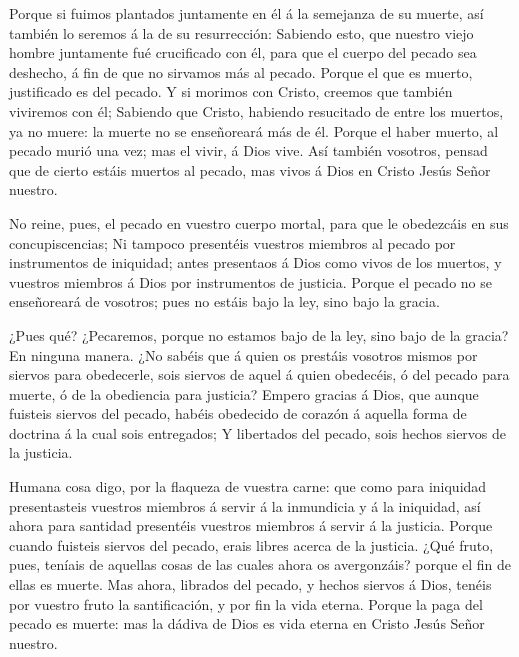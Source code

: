  Porque si fuimos plantados juntamente en él á la semejanza
de su muerte, así también lo seremos á la de su resurrección:
 Sabiendo esto, que nuestro viejo hombre juntamente fué
crucificado con él, para que el cuerpo del pecado sea deshecho, á fin de
que no sirvamos más al pecado.  Porque el que es muerto,
justificado es del pecado.  Y si morimos con Cristo, creemos
que también viviremos con él;  Sabiendo que Cristo, habiendo
resucitado de entre los muertos, ya no muere: la muerte no se
enseñoreará más de él.  Porque el haber muerto, al pecado
murió una vez; mas el vivir, á Dios vive.  Así también
vosotros, pensad que de cierto estáis muertos al pecado, mas vivos á
Dios en Cristo Jesús Señor nuestro.

 No reine, pues, el pecado en vuestro cuerpo mortal, para
que le obedezcáis en sus concupiscencias;  Ni tampoco
presentéis vuestros miembros al pecado por instrumentos de iniquidad;
antes presentaos á Dios como vivos de los muertos, y vuestros miembros á
Dios por instrumentos de justicia.  Porque el pecado no se
enseñoreará de vosotros; pues no estáis bajo la ley, sino bajo la
gracia.

 ¿Pues qué? ¿Pecaremos, porque no estamos bajo de la ley,
sino bajo de la gracia? En ninguna manera.  ¿No sabéis que
á quien os prestáis vosotros mismos por siervos para obedecerle, sois
siervos de aquel á quien obedecéis, ó del pecado para muerte, ó de la
obediencia para justicia?  Empero gracias á Dios, que
aunque fuisteis siervos del pecado, habéis obedecido de corazón á
aquella forma de doctrina á la cual sois entregados;  Y
libertados del pecado, sois hechos siervos de la justicia.

 Humana cosa digo, por la flaqueza de vuestra carne: que
como para iniquidad presentasteis vuestros miembros á servir á la
inmundicia y á la iniquidad, así ahora para santidad presentéis vuestros
miembros á servir á la justicia.  Porque cuando fuisteis
siervos del pecado, erais libres acerca de la justicia. 
¿Qué fruto, pues, teníais de aquellas cosas de las cuales ahora os
avergonzáis? porque el fin de ellas es muerte.  Mas ahora,
librados del pecado, y hechos siervos á Dios, tenéis por vuestro fruto
la santificación, y por fin la vida eterna.  Porque la paga
del pecado es muerte: mas la dádiva de Dios es vida eterna en Cristo
Jesús Señor nuestro.

